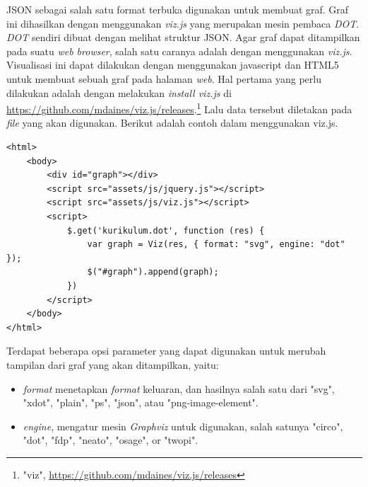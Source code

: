 JSON sebagai salah satu format terbuka digunakan untuk membuat graf. Graf ini dihasilkan dengan menggunakan \textit{viz.js} yang merupakan mesin pembaca \textit{DOT}. \textit{DOT} sendiri dibuat dengan melihat struktur JSON. Agar graf dapat ditampilkan pada suatu \textit{web browser}, salah satu caranya adalah dengan menggunakan \textit{viz.js}. Visualisasi ini dapat dilakukan dengan menggunakan javascript dan HTML5 untuk membuat sebuah graf pada halaman \textit{web}. Hal pertama yang perlu dilakukan adalah dengan melakukan
\textit{install viz.js} di \url{https://github.com/mdaines/viz.js/releases}.\footnote{"viz", \url{https://github.com/mdaines/viz.js/releases}} Lalu data tersebut
diletakan pada \textit{file} yang akan digunakan. Berikut adalah contoh dalam menggunakan viz.js.
\begin{lstlisting}
<html>
    <body>
        <div id="graph"></div>
        <script src="assets/js/jquery.js"></script>
        <script src="assets/js/viz.js"></script>
        <script>
            $.get('kurikulum.dot', function (res) {
                var graph = Viz(res, { format: "svg", engine: "dot" });
                $("#graph").append(graph);
            })
        </script>
    </body>
</html>
\end{lstlisting}

Terdapat beberapa opsi parameter yang dapat digunakan untuk merubah tampilan dari graf
yang akan ditampilkan, yaitu:
\begin{itemize}
\item \textit{format} menetapkan \textit{format} keluaran, dan hasilnya salah satu dari "svg", "xdot", "plain", "ps", "json", atau "png-image-element". 
\item \textit{engine}, mengatur mesin \textit{Graphviz} untuk digunakan, salah satunya "circo", "dot", "fdp", "neato", "osage", or "twopi".
\end{itemize}


